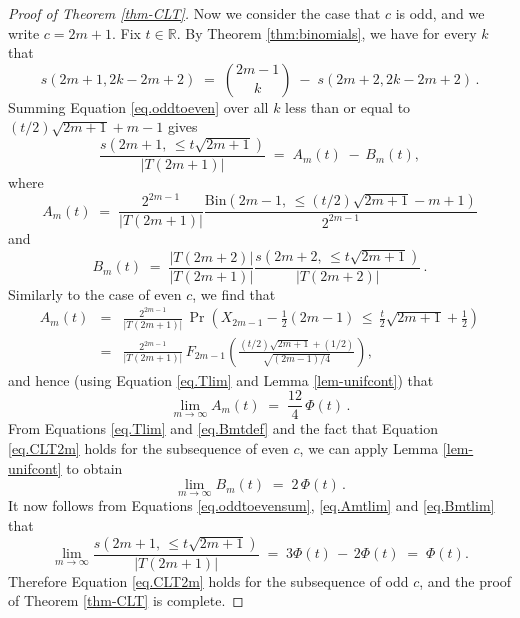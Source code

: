 \documentclass[11pt]{amsart}
\theoremstyle{definition}
\theoremstyle{remark}
\numberwithin{equation}{section}
\begin{document}
\begin{proof}[Proof of Theorem \ref{thm-CLT}]
Now we consider the case that $c$ is odd, and we write $c=2m+1$.   Fix $t\in \mathbb{R}$.  
By Theorem \ref{thm:binomials}, we have
for every $k$ that 
\begin{equation}
   \label{eq.oddtoeven}
   s(2m+1,2k-2m+2)   \;=\;   \binom{2m-1}{k}  \;-\;  s(2m+2,2k-2m+2) \,.
\end{equation}
Summing Equation \eqref{eq.oddtoeven} over all $k$ less than or equal to $(t/2)\sqrt{2m+1}+m-1$ gives
\begin{equation}
   \label{eq.oddtoevensum}
   \frac{s(2m+1,\,\leq t\sqrt{2m+1})}{|T(2m+1)|}  \;=\;   A_m(t)   \;-\, B_m(t), %
\end{equation}
where
\begin{equation*}
     \label{eq.Amtdef}
     A_m(t)  \; = \;   \frac{2^{2m-1}}{|T(2m+1)|}  \frac{ \mbox{Bin}(2m-1, \,\leq (t/2)\sqrt{2m+1}-m+1)}{2^{2m-1}}
\end{equation*}
and
\begin{equation}
     \label{eq.Bmtdef}
     B_m(t)  \; = \;   \frac{|T(2m+2)|}{|T(2m+1)|}  \frac{s(2m+2, \,\leq t\sqrt{2m+1})}{|T(2m+2)|}\,.
\end{equation}
Similarly to the case of even $c$, we find that 
\begin{eqnarray*}    A_m(t)  & = & 
   \frac{2^{2m-1}}{|T(2m+1)|} \,
  \Pr\left(X_{2m-1}-\frac{1}{2}(2m-1) \,\leq\, \frac{t}{2} \sqrt{2m+1}+\frac{1}{2}\right) 
   \\
   &=& \frac{2^{2m-1}}{|T(2m+1)|} \,F_{2m-1}\left(\frac{(t/2)\sqrt{2m+1} +(1/2)}{\sqrt{(2m-1)/4}}\right),
\end{eqnarray*}
and hence (using Equation \eqref{eq.Tlim} and Lemma \ref{lem-unifcont}) that
\begin{equation}
    \label{eq.Amtlim}
    \lim_{m\rightarrow\infty}A_m(t)  \;=\; \frac{12}{4} \,\Phi(t) \,.
\end{equation}
From Equations \eqref{eq.Tlim} and \eqref{eq.Bmtdef} and the fact that Equation \eqref{eq.CLT2m} holds for the subsequence of even $c$, 
we can apply Lemma \ref{lem-unifcont} to obtain 
 \begin{equation}
    \label{eq.Bmtlim}
    \lim_{m\rightarrow\infty}B_m(t)  \;=\; 2 \,\Phi(t) \,.
\end{equation}   
It now follows from Equations \eqref{eq.oddtoevensum}, \eqref{eq.Amtlim} and \eqref{eq.Bmtlim} that
\begin{equation*}
    \label{eq.soddlim}
    \lim_{m\rightarrow\infty}   \frac{s(2m+1,\,\leq t\sqrt{2m+1})}{|T(2m+1)|} \;=\; 3\Phi(t)\,-\,2\Phi(t)  \;=\; \Phi(t).
\end{equation*}
Therefore Equation \eqref{eq.CLT2m} holds for the subsequence of odd $c$, and the proof of Theorem \ref{thm-CLT} is complete. 
\end{proof}    
    
\end{document}
